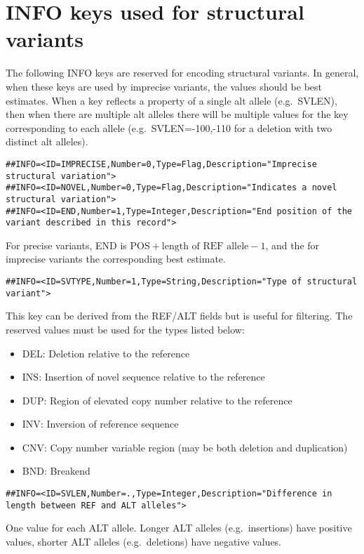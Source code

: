 \documentclass[8pt]{article}
\begin{document}
\section{INFO keys used for structural variants}
\label{sv-info-keys}
\begin{samepage}
The following INFO keys are reserved for encoding structural variants.
In general, when these keys are used by imprecise variants, the values should be best estimates.
When a key reflects a property of a single alt allele (e.g.\ SVLEN), then when there are multiple alt alleles there will be multiple values for the key corresponding to each allele (e.g.\ SVLEN=-100,-110 for a deletion with two distinct alt alleles).
\footnotesize
\begin{verbatim}
##INFO=<ID=IMPRECISE,Number=0,Type=Flag,Description="Imprecise structural variation">
##INFO=<ID=NOVEL,Number=0,Type=Flag,Description="Indicates a novel structural variation">
##INFO=<ID=END,Number=1,Type=Integer,Description="End position of the variant described in this record">
\end{verbatim}
\normalsize
For precise variants, END is $\mbox{POS} + \mbox{length of REF allele} - 1$, and the for imprecise variants the corresponding best estimate.

\footnotesize
\begin{verbatim}
##INFO=<ID=SVTYPE,Number=1,Type=String,Description="Type of structural variant">
\end{verbatim}
\normalsize
\end{samepage}
This key can be derived from the REF/ALT fields but is useful for filtering.
The reserved values must be used for the types listed below:
\begin{itemize}
  \item DEL: Deletion relative to the reference
  \item INS: Insertion of novel sequence relative to the reference
  \item DUP: Region of elevated copy number relative to the reference
  \item INV: Inversion of reference sequence
  \item CNV: Copy number variable region (may be both deletion and duplication)
  \item BND: Breakend
\end{itemize}

\footnotesize
\begin{verbatim}
##INFO=<ID=SVLEN,Number=.,Type=Integer,Description="Difference in length between REF and ALT alleles">
\end{verbatim}
\normalsize
One value for each ALT allele. Longer ALT alleles (e.g.\ insertions) have positive values, shorter ALT alleles (e.g.\ deletions) have negative values.
\end{document}
